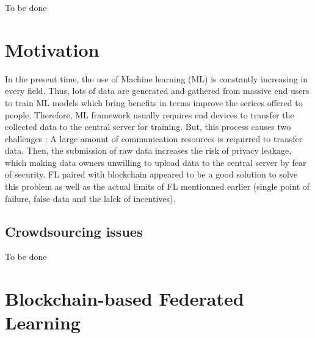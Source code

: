 \documentclass{article}
\begin{document}
To be done

\section{Motivation}

In the present time, the use of Machine learning (ML) is constantly increasing in every field. Thus, lots of data are generated and gathered from massive end users to train ML models which bring benefits in terms improve the serices offered to people. Therefore, ML framework usually requires end devices to transfer the collected data to the central server for training. But, this process causes two challenges : A large amount of communication resources is requirred to transfer data. Then, the submission of raw data increases the risk of privacy leakage, which making data owners unwilling to upload data to the central server by fear of security. FL paired with blockchain appeared to be a good solution to solve this problem as well as the actual limits of FL mentionned earlier (single point of failure, false data and the lalck of incentives).

\subsection{Crowdsourcing issues}

To be done

\section{Blockchain-based Federated Learning}
\end{document}
